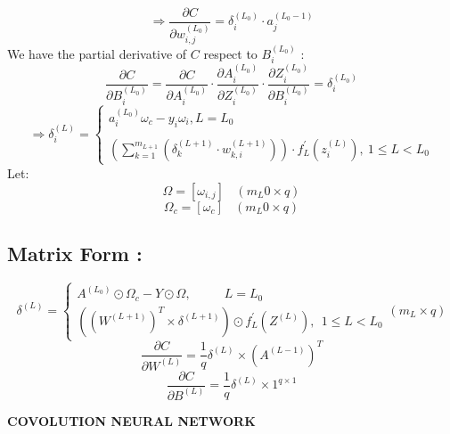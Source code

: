\documentclass{article}
\begin{document}
    \[
        \Rightarrow \frac{\partial C}{\partial w^{(L_0)}_{i, j}} = 
        \delta^{(L_0)}_i \cdot a^{(L_0-1)}_j
    \]
    We have the partial derivative of $C$ respect to $B^{(L_0)}_i$ :
    \[
        \frac{\partial C}{\partial B^{(L_0)}_{i}} = 
        \frac{\partial C}{\partial A^{(L_0)}_{i}} \cdot
        \frac{\partial A^{(L_0)}_{i}}{\partial Z^{(L_0)}_i} \cdot
        \frac{\partial Z^{(L_0)}_i}{\partial B^{(L_0)}_{i}} = 
        \delta^{(L_0)}_i
    \]
    \[
        \Rightarrow \delta^{(L)}_i = 
        \begin{cases}
            a_i^{(L_0)}\omega_c - y_i\omega_i, L = L_0\\ \\
            \left(
                \sum_{k = 1}^{m_{L+1}}\left(
                    \delta^{(L + 1)}_k \cdot w^{(L + 1)}_{k, i}
                \right) 
            \right) \cdot f_{L}^{\prime}\left(z^{(L)}_i\right), \ 1 \leq L < L_0
        \end{cases}
    \]
    Let: 
    \[
        \Omega = [\omega_{i, j}] \ \ \ \ (m_L0 \times q)
    \]
    \[
        \Omega_c = [\omega_c] \ \ \ \ (m_L0 \times q)
    \]
    \subsection*{Matrix Form : }
    \[
        \delta^{(L)} = 
        \begin{cases}
            A^{(L_0)}\odot\Omega_c - Y\odot\Omega , \ \ \ \ \ \ \ \ \ \ \ \ L = L_0 \\
            \left(\left(W^{(L + 1)}\right)^T \times \delta^{(L + 1)} \right) \odot
            f^{\prime}_{L}\left(Z^{(L)}\right), \ \ 1 \le L < L_0
        \end{cases} (m_{L} \times q)
    \]
    \[
        \frac{\partial C}{\partial W^{(L)}} = \frac{1}{q}\delta^{(L)} \times \left(A^{(L-1)}\right)^T
    \]
    \[
        \frac{\partial C}{\partial B^{(L)}} = \frac{1}{q}\delta^{(L)} \times 1^{q \times 1}
    \]
    \begin{center}
        {\Large \textbf{COVOLUTION NEURAL NETWORK}}
    \end{center}
\end{document}
